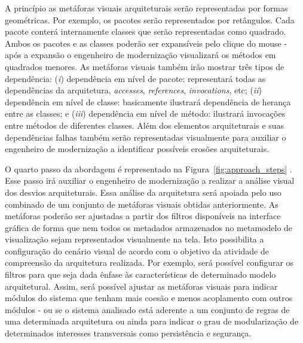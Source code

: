 \documentclass[12pt]{article}
\begin{document}
A princípio as metáforas visuais arquiteturais serão representadas por formas geométricas. Por exemplo, os pacotes serão representados por retângulos. Cada pacote conterá internamente classes que serão representadas como quadrado. Ambos os pacotes e as classes poderão ser expansíveis pelo clique do mouse - após a expansão o engenheiro de modernização visualizará os métodos em quadrados menores. As metáforas visuais também irão mostrar três tipos de dependência: (\textit{i}) dependência em nível de pacote: representará todas as dependências da arquitetura, \textit{accesses}, \textit{references}, \textit{invocations}, etc; (\textit{ii}) dependência em nível de classe: basicamente ilustrará dependência de herança entre as classes; e (\textit{iii}) dependência em nível de método: ilustrará invocações entre métodos de diferentes classes. Além dos elementos arquiteturais e suas dependências falhas também serão representadas visualmente para auxiliar o engenheiro de modernização a identificar possíveis erosões arquiteturais.


O quarto passo da abordagem é representado na Figura~\ref{fig:approach_steps} . Esse passo irá auxiliar o engenheiro de modernização a realizar a análise visual dos desvios arquiteturais. Essa análise da arquitetura será apoiada pelo uso combinado de um conjunto de metáforas visuais obtidas anteriormente. As metáforas poderão ser ajustadas a partir dos filtros disponíveis na interface gráfica de forma que nem todos os metadados armazenados no metamodelo de visualização sejam representados visualmente na tela. Isto possibilita a configuração do cenário visual de acordo com o objetivo da atividade de compreensão da arquitetura realizada. Por exemplo, será possível configurar os filtros para que seja dada ênfase às características de determinado modelo arquitetural. Assim, será possível ajustar as metáforas visuais para indicar módulos do sistema que tenham mais coesão e menos acoplamento com outros módulos - ou se o sistema analisado está aderente a um conjunto de regras de uma determinada arquitetura ou ainda para indicar o grau de modularização de determinados interesses transversais como persistência e segurança.
\end{document}
